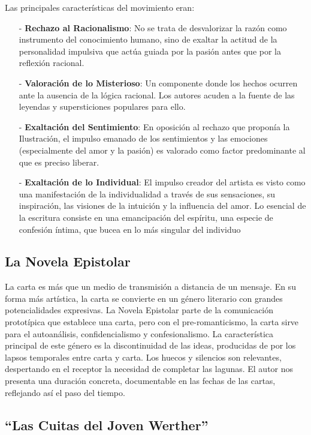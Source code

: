 \documentclass{article}
\begin{document}
Las principales características del movimiento eran:
\begin{itemize}
    \item[-] \textbf{Rechazo al Racionalismo}: No se trata de desvalorizar la razón como instrumento del conocimiento humano, sino de exaltar la actitud de la personalidad impulsiva que actúa guiada por la pasión antes que por la reflexión racional.
    \item[-] \textbf{Valoración de lo Misterioso}: Un componente donde los hechos ocurren ante la ausencia de la lógica racional. Los autores acuden a la fuente de las leyendas y supersticiones populares para ello.
    \item[-] \textbf{Exaltación del Sentimiento}: En oposición al
    rechazo que proponía la Ilustración, el impulso emanado de los sentimientos y las emociones (especialmente del amor y la pasión) es valorado como factor predominante al que es preciso liberar.
    \item[-]  \textbf{Exaltación de lo Individual}: El impulso creador del artista es visto como una manifestación de la individualidad a través de sus sensaciones, su inspiración, las visiones de la intuición y la influencia del amor. Lo esencial de la escritura consiste en una emancipación del espíritu, una especie de confesión íntima, que bucea en lo más singular del individuo
\end{itemize}

\subsection{La Novela Epistolar}

La carta es más que un medio de transmisión a distancia de un mensaje. En su forma más artística, la carta se convierte en un género literario con grandes potencialidades expresivas. La Novela Epistolar parte de la comunicación prototípica que establece una carta, pero con el pre-romanticismo, la carta sirve para el autoanálisis, confidencialismo y confesionalismo. La característica principal de este género es la discontinuidad de las ideas, producidas de por los lapsos temporales entre carta y carta. Los huecos y silencios son relevantes, despertando en el receptor la necesidad de completar las lagunas. El autor nos presenta una duración concreta, documentable en las fechas de las cartas, reflejando así el paso del tiempo.

\subsection{``Las Cuitas del Joven Werther''}
\end{document}
